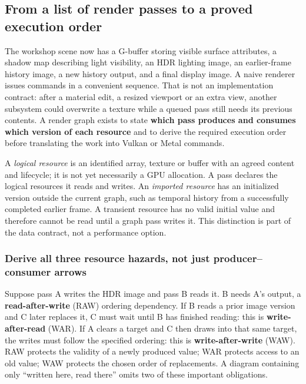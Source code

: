\subsection{From a list of render passes to a proved execution order}\label{from-a-list-of-render-passes-to-a-proved-execution-order}

The workshop scene now has a G-buffer storing visible surface attributes, a shadow map describing light visibility, an HDR lighting image, an earlier-frame history image, a new history output, and a final display image. A naive renderer issues commands in a convenient sequence. That is not an implementation contract: after a material edit, a resized viewport or an extra view, another subsystem could overwrite a texture while a queued pass still needs its previous contents. A render graph exists to state \textbf{which pass produces and consumes which version of each resource} and to derive the required execution order before translating the work into Vulkan or Metal commands.

A \emph{logical resource} is an identified array, texture or buffer with an agreed content and lifecycle; it is not yet necessarily a GPU allocation. A pass declares the logical resources it reads and writes. An \emph{imported resource} has an initialized version outside the current graph, such as temporal history from a successfully completed earlier frame. A transient resource has no valid initial value and therefore cannot be read until a graph pass writes it. This distinction is part of the data contract, not a performance option.

\subsubsection{Derive all three resource hazards, not just producer--consumer arrows}\label{derive-all-three-resource-hazards-not-just-producerconsumer-arrows}

Suppose pass A writes the HDR image and pass B reads it. B needs A's output, a \textbf{read-after-write} (RAW) ordering dependency. If B reads a prior image version and C later replaces it, C must wait until B has finished reading: this is \textbf{write-after-read} (WAR). If A clears a target and C then draws into that same target, the writes must follow the specified ordering: this is \textbf{write-after-write} (WAW). RAW protects the validity of a newly produced value; WAR protects access to an old value; WAW protects the chosen order of replacements. A diagram containing only ``written here, read there'' omits two of these important obligations.

